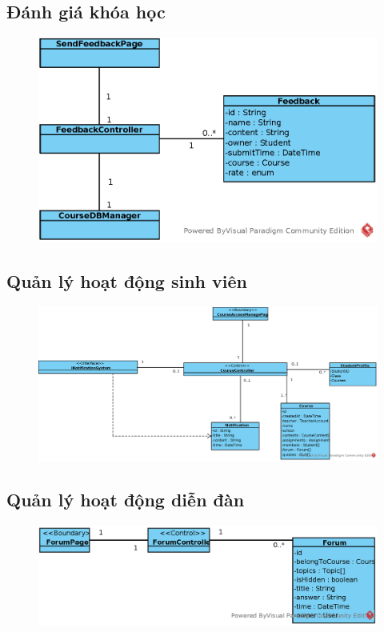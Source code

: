 \documentclass[./../main_file.tex]{subfiles}
\begin{document}
\subsection{Đánh giá khóa học}
\begin{figure}[H]
	\centering
	\includegraphics[width=\linewidth]{./images/define_attribute/ucd_atr_feedbackcourse.eps}
\end{figure}
\subsection{Quản lý hoạt động sinh viên}
\begin{figure}[H]
	\centering
	\includegraphics[width=\linewidth]{./images/define_attribute/ucd_at_ss_manage_student_activity.eps}
\end{figure}
\subsection{Quản lý hoạt động diễn đàn}
\begin{figure}[H]
	\centering
	\includegraphics[width=\linewidth]{./images/define_attribute/ucd_at_manage_forum.eps}
\end{figure}
\end{document}
